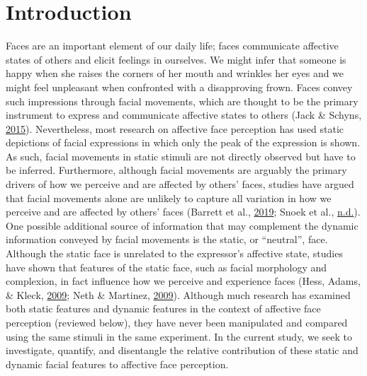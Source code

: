 \documentclass[11pt,american,]{memoir} %
\begin{document}
\hypertarget{svsd-introduction}{%
\section{Introduction}\label{svsd-introduction}}

Faces are an important element of our daily life; faces communicate affective states of others and elicit feelings in ourselves. We might infer that someone is happy when she raises the corners of her mouth and wrinkles her eyes and we might feel unpleasant when confronted with a disapproving frown. Faces convey such impressions through facial movements, which are thought to be the primary instrument to express and communicate affective states to others (Jack \& Schyns, \protect\hyperlink{ref-Jack2015-sh}{2015}). Nevertheless, most research on affective face perception has used static depictions of facial expressions in which only the peak of the expression is shown. As such, facial movements in static stimuli are not directly observed but have to be inferred. Furthermore, although facial movements are arguably the primary drivers of how we perceive and are affected by others' faces, studies have argued that facial movements alone are unlikely to capture all variation in how we perceive and are affected by others' faces (Barrett et al., \protect\hyperlink{ref-Barrett2019-bc}{2019}; Snoek et al., \protect\hyperlink{ref-snoek-submitted}{n.d.}). One possible additional source of information that may complement the dynamic information conveyed by facial movements is the static, or ``neutral'', face. Although the static face is unrelated to the expressor's affective state, studies have shown that features of the static face, such as facial morphology and complexion, in fact influence how we perceive and experience faces (Hess, Adams, \& Kleck, \protect\hyperlink{ref-Hess2009-xo}{2009}; Neth \& Martinez, \protect\hyperlink{ref-Neth2009-eh}{2009}). Although much research has examined both static features and dynamic features in the context of affective face perception (reviewed below), they have never been manipulated and compared using the same stimuli in the same experiment. In the current study, we seek to investigate, quantify, and disentangle the relative contribution of these static and dynamic facial features to affective face perception.
\end{document}
